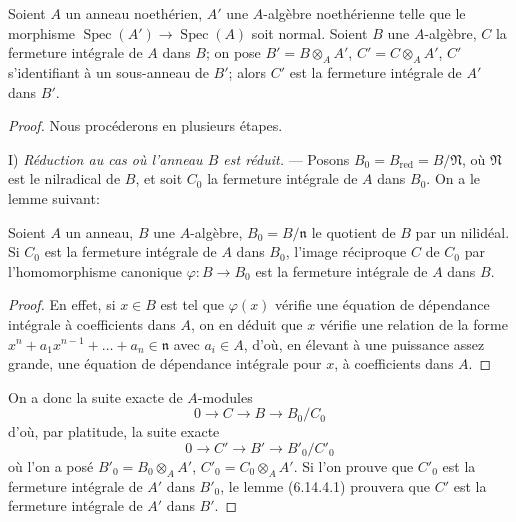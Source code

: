 \begin{proposition}[6.14.4]
Soient $A$ un anneau noethérien, $A'$ une $A$-algèbre noethérienne telle
que le morphisme $\operatorname{Spec}(A')\to\operatorname{Spec}(A)$ soit
normal. Soient $B$ une $A$-algèbre, $C$ la fermeture intégrale de $A$ dans
$B$; on pose $B'=B\otimes_A A'$, $C'=C\otimes_A A'$, $C'$ s'identifiant à
un sous-anneau de $B'$; alors $C'$ est la fermeture intégrale de $A'$ dans
$B'$.
\end{proposition}

\begin{proof}
Nous procéderons en plusieurs étapes.

I) \emph{Réduction au cas où l'anneau $B$ est réduit.} --- Posons
$B_0=B_{\mathrm{red}}=B/\mathfrak N$, où $\mathfrak N$ est le nilradical
de $B$, et soit $C_0$ la fermeture intégrale de $A$ dans $B_0$. On a le
lemme suivant:

\begin{lemma}[6.14.4.1]
\label{IV.2.s6.14.4.1-fr}
Soient $A$ un anneau, $B$ une $A$-algèbre, $B_0=B/\mathfrak n$ le quotient
de $B$ par un nilidéal. Si $C_0$ est la fermeture intégrale de $A$ dans
$B_0$, l'image réciproque $C$ de $C_0$ par l'homomorphisme canonique
$\varphi:B\to B_0$ est la fermeture intégrale de $A$ dans $B$.
\end{lemma}

\begin{proof}
En effet, si $x\in B$ est tel que $\varphi(x)$ vérifie une équation de
dépendance intégrale à coefficients dans $A$, on en déduit que $x$ vérifie
une relation de la forme
$x^n+a_1x^{n-1}+\ldots+a_n\in\mathfrak n$ avec $a_i\in A$, d'où, en
élevant à une puissance assez grande, une équation de dépendance intégrale
pour $x$, à coefficients dans $A$.
\end{proof}

On a donc la suite exacte de $A$-modules
\[
0\longrightarrow C\longrightarrow B\longrightarrow B_0/C_0
\]
d'où, par platitude, la suite exacte
\[
0\longrightarrow C'\longrightarrow B'\longrightarrow B'_0/C'_0
\]
où l'on a posé $B'_0=B_0\otimes_A A'$, $C'_0=C_0\otimes_A A'$. Si l'on
prouve que $C'_0$ est la fermeture intégrale de $A'$ dans $B'_0$, le lemme
(6.14.4.1) prouvera que $C'$ est la fermeture intégrale de $A'$ dans $B'$.


\end{proof}
